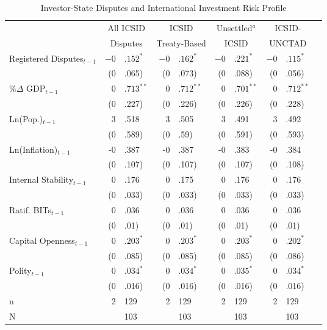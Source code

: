 \documentclass[12pt,onesided]{amsart}
\begin{document}
\begin{savenotes}
\begin{table}[ht]
\vspace{3cm}
\centering
\caption{Investor-State Disputes and International Investment Risk Profile}
\label{tab:dispRepLevel}
\begin{tabular}{lr@{} lr@{}lr@{}lr@{}lr@{}}
  \hline\hline
  & \multicolumn{2}{c}{All ICSID} & \multicolumn{2}{c}{ICSID} & \multicolumn{2}{c}{Unsettled$^{a}$} & \multicolumn{2}{c}{ICSID-} \\ 
  & \multicolumn{2}{c}{Disputes} & \multicolumn{2}{c}{Treaty-Based} & \multicolumn{2}{c}{ICSID} & \multicolumn{2}{c}{UNCTAD} \\
 \hline
Registered Disputes$_{t-1}$ & $-0$&$.152^{\ast}$ & $-0$&$.162^{\ast}$ & $-0$&$.221^{\ast}$ & $-0$&$.115^{\ast}$ \\ 
   & (0&.065) & (0&.073) & (0&.088) & (0&.056) \\ 
  \%$\Delta$ GDP$_{t-1}$ & $0$&$.713^{\ast\ast}$ & $0$&$.712^{\ast\ast}$ & $0$&$.701^{\ast\ast}$ & $0$&$.712^{\ast\ast}$ \\ 
   & (0&.227) & (0&.226) & (0&.226) & (0&.228) \\ 
  Ln(Pop.)$_{t-1}$ & 3&.518 & 3&.505 & 3&.491 & 3&.492 \\ 
   & (0&.589) & (0&.59) & (0&.591) & (0&.593) \\ 
  Ln(Inflation)$_{t-1}$ & -0&.387 & -0&.387 & -0&.383 & -0&.384 \\ 
   & (0&.107) & (0&.107) & (0&.107) & (0&.108) \\ 
  Internal Stability$_{t-1}$ & 0&.176 & 0&.175 & 0&.176 & 0&.176 \\ 
   & (0&.033) & (0&.033) & (0&.033) & (0&.033) \\ 
  Ratif. BITs$_{t-1}$ & 0&.036 & 0&.036 & 0&.036 & 0&.036 \\ 
   & (0&.01) & (0&.01) & (0&.01) & (0&.01) \\ 
  Capital Openness$_{t-1}$ & $0$&$.203^{\ast}$ & $0$&$.203^{\ast}$ & $0$&$.203^{\ast}$ & $0$&$.202^{\ast}$ \\ 
   & (0&.085) & (0&.085) & (0&.085) & (0&.086) \\ 
  Polity$_{t-1}$ & $0$&$.034^{\ast}$ & $0$&$.034^{\ast}$ & $0$&$.035^{\ast}$ & $0$&$.034^{\ast}$ \\ 
   & (0&.016) & (0&.016) & (0&.016) & (0&.016) \\ 
   \hline
  n & 2&129 & 2&129 & 2&129 & 2&129 \\ 
  N && 103 && 103 && 103 && 103 \\ 

\end{tabular}
\end{table}
\end{savenotes}
\end{document}
